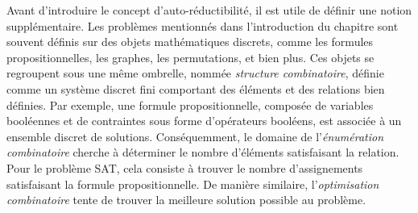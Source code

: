 Avant d'introduire le concept d'auto-réductibilité, il est utile de définir une notion supplémentaire. Les problèmes mentionnés dans l'introduction du chapitre sont souvent définis sur des objets mathématiques discrets, comme les formules propositionnelles, les graphes, les permutations, et bien plus. Ces objets se regroupent sous une même ombrelle, nommée \textit{structure combinatoire}, définie comme un système discret fini comportant des éléments et des relations bien définies. Par exemple, une formule propositionnelle, composée de variables booléennes et de contraintes sous forme d'opérateurs booléens, est associée à un ensemble discret de solutions. Conséquemment, le domaine de l'\textit{énumération combinatoire} cherche à déterminer le nombre d'éléments satisfaisant la relation. Pour le problème SAT, cela consiste à trouver le nombre d'assignements satisfaisant la formule propositionnelle. De manière similaire, l'\textit{optimisation combinatoire} tente de trouver la meilleure solution possible au problème.

